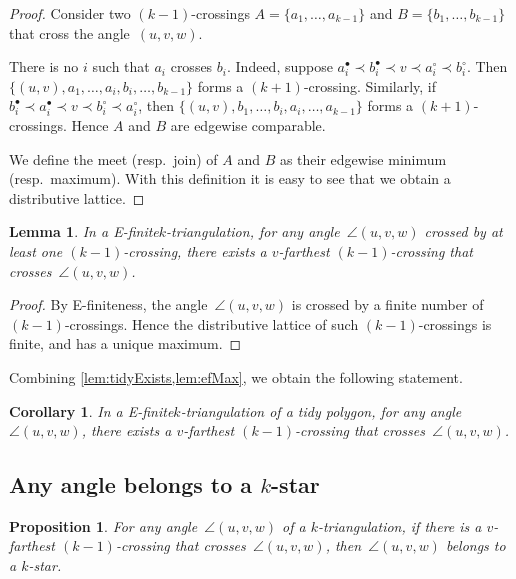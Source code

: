 \documentclass{amsart}
\newtheorem{proposition}[theorem]{Proposition}
\newtheorem{lemma}[theorem]{Lemma}
\newtheorem{corollary}[theorem]{Corollary}
\theoremstyle{remark}
\newcommand*{\ef}[0]{E-finite\xspace}
\newcommand*{\ktg}[0]{$k$-triangulation\xspace}
\newcommand{\cl}{\prec}
\begin{document}
\begin{proof}
Consider two $(k-1)$-crossings $A = \{a_1, \dots, a_{k-1}\}$ and $B = \{b_1, \dots, b_{k-1}\}$ that cross the angle~$(u,v,w)$.

There is no $i$ such that $a_i$ crosses $b_i$. 
Indeed, suppose $a^\bullet_i \cl b^\bullet_i \cl v \cl a^\circ_i \cl b^\circ_i$. Then $\{(u, v), a_1, \dots, a_i, b_i, \dots, b_{k-1}\}$ forms a $(k+1)$-crossing. 
Similarly, if $b^\bullet_i \cl a^\bullet_i \cl v \cl b^\circ_i \cl a^\circ_i$, then $\{(u, v), b_1, \dots, b_i, a_i, \dots, a_{k-1}\}$ forms a $(k+1)$-crossings.
Hence $A$ and $B$ are edgewise comparable.

We define the meet (resp.~join) of $A$ and $B$ as their edgewise minimum (resp.~maximum). With this definition it is easy to see that we obtain a distributive lattice.
\end{proof}

\begin{lemma}
\label{lem:efMax}
In a \ef \ktg, for any angle~$\angle(u,v,w)$ crossed by at least one $(k-1)$-crossing, there exists a $v$-farthest $(k-1)$-crossing that crosses~$\angle(u,v,w)$.
\end{lemma}

\begin{proof}
By \ef{}ness, the angle~$\angle(u,v,w)$ is crossed by a finite number of $(k-1)$-crossings. Hence the distributive lattice of such $(k-1)$-crossings is finite, and has a unique maximum.
\end{proof}

Combining \cref{lem:tidyExists,lem:efMax}, we obtain the following statement.

\begin{corollary}
\label{coro:farthestTidy}
In a \ef \ktg of a tidy polygon, for any angle~$\angle(u,v,w)$, there exists a $v$-farthest $(k-1)$-crossing that crosses~$\angle(u,v,w)$.
\end{corollary}

\subsection{Any angle belongs to a $k$-star}

\begin{proposition}
\label{prop:angleBelongStar}
For any angle~$\angle(u,v,w)$ of a \ktg, if there is a $v$-farthest $(k-1)$-crossing that crosses~$\angle(u,v,w)$, then~$\angle(u,v,w)$ belongs to a $k$-star.
\end{proposition}
\end{document}
